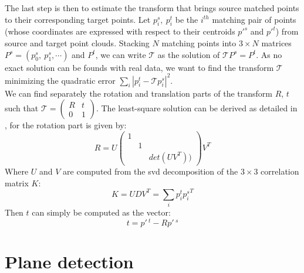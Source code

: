     The last step is then to estimate the transform that brings source matched points to their corresponding target points. Let $p_i^s, \:p_i^t$ be the $i^{th}$ matching pair of points (whose coordinates are expressed with respect to their centroids $p'^s$ and $p'^t$) from source and target point clouds. Stacking $N$ matching points into $3\times N$ matrices $P^s = \left ( p_0^s,\:p_1^s, \cdots  \right )$ and $P^t$, we can write $\mathcal{T}$ as the solution of $\mathcal{T}P^s = P^t$. As no exact solution can be founds with real data, we want to find the transform $\mathcal{T}$ minimizing the quadratic error $\sum_i\left | p_i^t - \mathcal{T}p_i^s \right |^2$. \\
    We can find separately the rotation and translation parts of the transform $R$, $t$ such that 
    $\mathcal{T}=\begin{pmatrix}
    R & t\\ 
    0 & 1
    \end{pmatrix}$.
    The least-square solution can be derived as detailed in \cite{sork2017}, for the rotation part is given by: 
    \[
    R=U\begin{pmatrix}
    1 &  & \\ 
     & 1 & \\ 
     &  & det(UV^T))
    \end{pmatrix}V^T
    \]
    Where $U$ and $V$ are computed from the \acrshort{svd} decomposition of the $3\times 3$ correlation matrix $K$:
    \[
    K=UDV^T=\sum_i p_i^t{p_i^s}^T
    \]
    Then $t$ can simply be computed as the vector: 
    \[
        t=p'\,^t-Rp'\,^s
    \]

\section{Plane detection}

